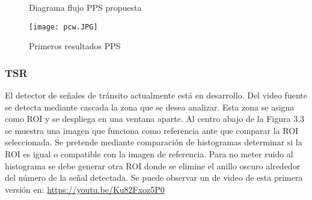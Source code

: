\begin{figure}[H]
  \centering
  \caption{Diagrama flujo PPS propuesta}
  \label{fig:diag_pps}
\end{figure}

\begin{figure}[H]
  \centering
  \texttt{[image: pcw.JPG]}
  \caption{Primeros resultados PPS }
  \label{fig:boat2}
\end{figure}
\newpage

\subsubsection{TSR}
El detector de señales de tránsito actualmente está en desarrollo. Del video fuente se detecta mediante cascada la zona que se desea analizar. Esta zona se asigna como ROI y se despliega en una ventana aparte. Al centro abajo de la Figura 3.3 se muestra una imagen que funciona como referencia ante que comparar la ROI seleccionada. Se pretende mediante comparación de histogramas determinar si la ROI es igual o compatible con la imagen de referencia. Para no meter ruido al histograma se debe generar otra ROI donde se elimine el anillo oscuro alrededor del número de la señal detectada. Se puede observar un de video de esta primera versión en: \url{https://youtu.be/Ku82Fxoz5P0}


